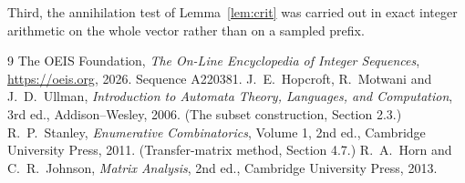 \documentclass[11pt,a4paper]{article}
\theoremstyle{plain}
\theoremstyle{definition}
\begin{document}
Third, the annihilation test of Lemma~\ref{lem:crit} was carried out in exact integer
arithmetic on the whole vector rather than on a sampled prefix.

\begin{thebibliography}{9}
 The OEIS Foundation, \emph{The On-Line Encyclopedia of Integer
Sequences}, \url{https://oeis.org}, 2026. Sequence A220381.
 J.~E.~Hopcroft, R.~Motwani and J.~D.~Ullman, \emph{Introduction to Automata
Theory, Languages, and Computation}, 3rd ed., Addison--Wesley, 2006. (The subset
construction, Section 2.3.)
 R.~P.~Stanley, \emph{Enumerative Combinatorics}, Volume 1, 2nd ed.,
Cambridge University Press, 2011. (Transfer-matrix method, Section 4.7.)
 R.~A.~Horn and C.~R.~Johnson, \emph{Matrix Analysis}, 2nd ed., Cambridge
University Press, 2013.
\end{thebibliography}
\end{document}
